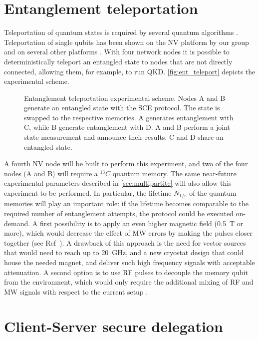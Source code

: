 \documentclass[a4paper, twoside]{article}
\begin{document}
\section{Entanglement teleportation}
\label{sec:teleportation}
Teleportation of quantum states is required by several quantum algorithms . Teleportation of single qubits has been shown on the NV platform by our group \cite{Pfaff2014} and on several other platforms \cite{Takeda2013, Wang2015, Valivarthi2016}.
With four network nodes it is possible to deterministically teleport an entangled state to nodes that are not directly connected, allowing them, for example, to run \ac{QKD}. \autoref{fig:ent_teleport} depicts the experimental scheme. 

\begin{figure}
	\caption{Entanglement teleportation experimental scheme. Nodes A and B generate an entangled state with the \ac{SCE} protocol. The state is swapped to the respective memories. A generates entanglement with C, while B generate entanglement with D. A and B perform a joint state measurement and announce their results. C and D share an entangled state. }
	\label{fig:ent_teleport}
\end{figure}

A fourth NV node will be built to perform this experiment, and two of the four nodes (A and B) will require a ${}^{13}C$ quantum memory. The same near-future experimental parameters described in \autoref{sec:multipartite} will also allow this experiment to be performed. In particular, the lifetime $N_{1/e}$ of the quantum memories will play an important role: if the lifetime becomes comparable to the required number of entanglement attempts, the protocol could be executed on-demand. A first possibility is to apply an even higher magnetic field (\SI{0.5}{T} or more), which would decrease the effect of \ac{MW} errors by making the pulses closer together (see Ref~\cite{Kalb2017}). A drawback of this approach is the need for vector sources that would need to reach up to \SI{20}{GHz}, and a new cryostat design that could house the needed magnet, and deliver such high frequency signals with acceptable attenuation.
A second option is to use \ac{RF} pulses to decouple the memory qubit from the environment, which would only require the additional mixing of \ac{RF} and \ac{MW} signals with respect to the current setup \cite{Bradley2018}. 

\section{Client-Server secure delegation}
\label{sec:delegation}
\end{document}
